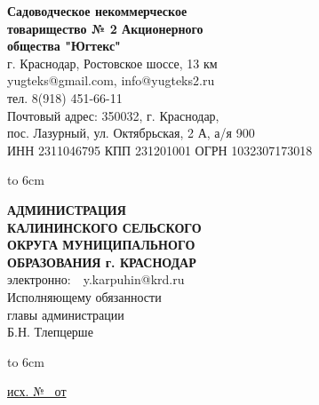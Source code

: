 \noindent\parbox[l][71mm]{80mm}
{
	 \begin{center}
 {\small \textbf{Садоводческое некоммерческое\\ товарищество
 	№  2 Акционерного\\ общества "Югтекс"\\
 }}
 \footnotesize{г. Краснодар, Ростовское шоссе, 13 км\\
 	yugteks@gmail.com, info@yugteks2.ru\\
 	тел. 8(918) 451-66-11\\
 	Почтовый адрес: 350032, г. Краснодар,\\ пос. Лазурный, ул. Октябрьская, 2 А, а/я   900
  }\\
 {ИНН 2311046795 КПП 231201001 ОГРН 1032307173018}
		\end{center}
\hbox to 6cm{ }}\hfill
\parbox[l][71mm]{65mm}
{ \begin{center}
  {\small \textbf{АДМИНИСТРАЦИЯ\\ КАЛИНИНСКОГО
 		СЕЛЬСКОГО\\ ОКРУГА МУНИЦИПАЛЬНОГО\\
 		ОБРАЗОВАНИЯ г. КРАСНОДАР\\
 }}
 \vspace{2mm}
 \footnotesize{электронно: \,\ y.karpuhin@krd.ru\\
 \vspace{2mm}
 {\normalsize  	 Исполняющему обязанности\\
 	главы администрации\\}
 	 \vspace{6mm}
 	 {\normalsize 	Б.Н. Тлепцерше}
 }\\
 \end{center}
\hbox to 6cm{ }}
\linebreak
\vspace{-10mm}

\underline{исх. №  \ от } 